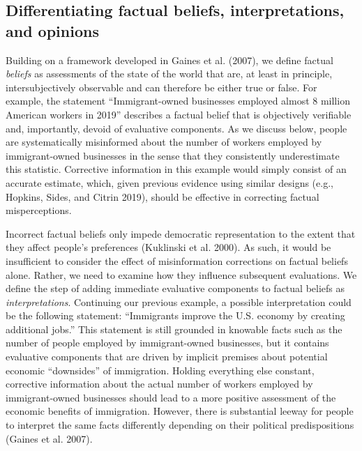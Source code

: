 \documentclass[
  12pt,
]{article}
\begin{document}
\hypertarget{differentiating-factual-beliefs-interpretations-and-opinions}{%
\subsection{Differentiating factual beliefs, interpretations, and
opinions}\label{differentiating-factual-beliefs-interpretations-and-opinions}}

Building on a framework developed in Gaines et al. (2007), we define
factual \emph{beliefs} as assessments of the state of the world that
are, at least in principle, intersubjectively observable and can
therefore be either true or false. For example, the statement
``Immigrant-owned businesses employed almost 8 million American workers
in 2019'' describes a factual belief that is objectively verifiable and,
importantly, devoid of evaluative components. As we discuss below,
people are systematically misinformed about the number of workers
employed by immigrant-owned businesses in the sense that they
consistently underestimate this statistic. Corrective information in
this example would simply consist of an accurate estimate, which, given
previous evidence using similar designs (e.g., Hopkins, Sides, and
Citrin 2019), should be effective in correcting factual misperceptions.

Incorrect factual beliefs only impede democratic representation to the
extent that they affect people's preferences (Kuklinski et al. 2000). As
such, it would be insufficient to consider the effect of misinformation
corrections on factual beliefs alone. Rather, we need to examine how
they influence subsequent evaluations. We define the step of adding
immediate evaluative components to factual beliefs as
\emph{interpretations}. Continuing our previous example, a possible
interpretation could be the following statement: ``Immigrants improve
the U.S. economy by creating additional jobs.'' This statement is still
grounded in knowable facts such as the number of people employed by
immigrant-owned businesses, but it contains evaluative components that
are driven by implicit premises about potential economic ``downsides''
of immigration. Holding everything else constant, corrective information
about the actual number of workers employed by immigrant-owned
businesses should lead to a more positive assessment of the economic
benefits of immigration. However, there is substantial leeway for people
to interpret the same facts differently depending on their political
predispositions (Gaines et al. 2007).
\end{document}

